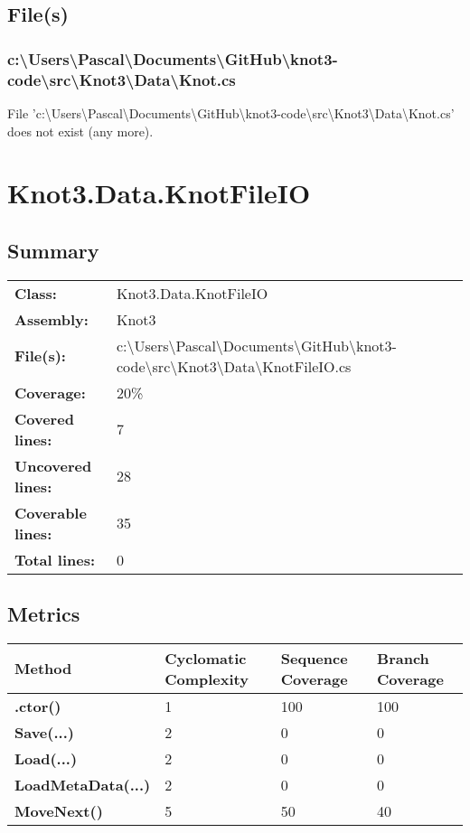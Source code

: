 \documentclass[a4paper,10pt]{article}
\begin{document}
\subsection{File(s)}
\subsubsection{c:\textbackslash Users\textbackslash Pascal\textbackslash Documents\textbackslash GitHub\textbackslash knot3-code\textbackslash src\textbackslash Knot3\textbackslash Data\textbackslash Knot.cs}
 File 'c:\textbackslash Users\textbackslash Pascal\textbackslash Documents\textbackslash GitHub\textbackslash knot3-code\textbackslash src\textbackslash Knot3\textbackslash Data\textbackslash Knot.cs' does not exist (any more).
\newpage
\section{Knot3.Data.KnotFileIO}
\subsection{Summary}
\begin{longtable}[l]{ll}
\textbf{Class:} & Knot3.Data.KnotFileIO\\
\textbf{Assembly:} & Knot3\\
\textbf{File(s):} & \begin{minipage}[t]{12cm}{c:\textbackslash Users\textbackslash Pascal\textbackslash Documents\textbackslash GitHub\textbackslash knot3-code\textbackslash src\textbackslash Knot3\textbackslash Data\textbackslash KnotFileIO.cs}\end{minipage} \\
\textbf{Coverage:} & 20\%\\
\textbf{Covered lines:} & 7\\
\textbf{Uncovered lines:} & 28\\
\textbf{Coverable lines:} & 35\\
\textbf{Total lines:} & 0\\
\end{longtable}
\subsection{Metrics}
\begin{longtable}[l]{|l|l|l|l|}
\hline
\textbf{Method} & \textbf{Cyclomatic Complexity} & \textbf{Sequence Coverage} & \textbf{Branch Coverage}\\
\hline
\textbf{.ctor()} & 1 & 100 & 100\\
\hline
\textbf{Save(...)} & 2 & 0 & 0\\
\hline
\textbf{Load(...)} & 2 & 0 & 0\\
\hline
\textbf{LoadMetaData(...)} & 2 & 0 & 0\\
\hline
\textbf{MoveNext()} & 5 & 50 & 40\\
\hline
\end{longtable}
\end{document}
